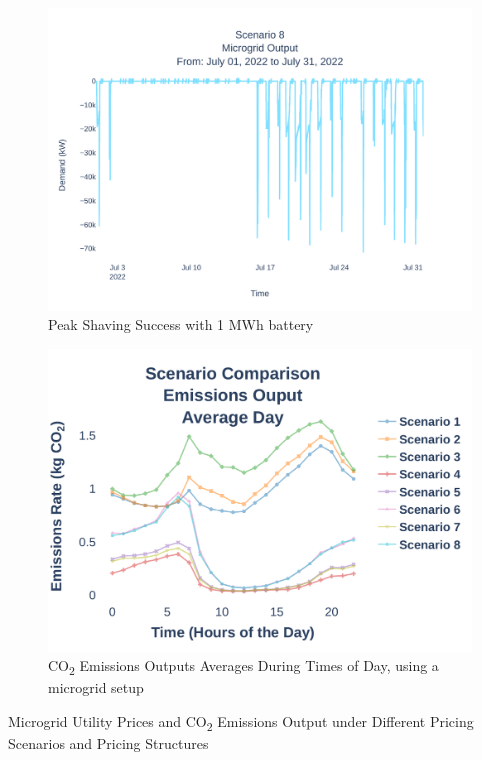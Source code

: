 \documentclass[conference]{IEEEtran}
\begin{document}
\begin{figure}
	\centering
	\includegraphics[width=0.9\linewidth]{Fig/Option_3/4_Scenario_8_Run_3_Mg_Output_Jul_01_2022_to_Jul_31_2022.pdf}
	\caption{\footnotesize Peak Shaving Success with 1 MWh battery}
	\label{fig:scenario4peakshaving}
\end{figure}
	\begin{figure}
		\centering
		\includegraphics[width=0.9\linewidth]{Fig/Option_3/emissions_scenario_comparison_run_3_large_font.pdf}
		\caption{\footnotesize  CO\textsubscript{2} Emissions Outputs Averages During Times of Day, using a microgrid setup}
		\label{fig:emissionsscenariocomparison}
	\end{figure}
	\begin{table}
		\caption{Microgrid Utility Prices and CO\textsubscript{2} Emissions Output under Different Pricing Scenarios and Pricing Structures}
		\tiny
		\centering
		
		\normalsize
		\label{tab:emissions}
	\end{table}	
\end{document}
